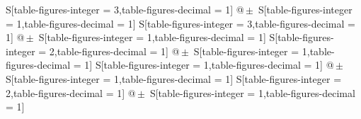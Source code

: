 \begin{table}[h]
\centering
\caption{Die Messwerte und die bereits berechneten Werte für die Wärmekapazitäten.}
\begin{tabular}{
	S[table-figures-integer = 3,table-figures-decimal = 1]
	@{\,$\pm{}$\,}
	S[table-figures-integer = 1,table-figures-decimal = 1]
	S[table-figures-integer = 3,table-figures-decimal = 1]
	@{\,$\pm{}$\,}
	S[table-figures-integer = 1,table-figures-decimal = 1]
	S[table-figures-integer = 2,table-figures-decimal = 1]
	@{\,$\pm{}$\,}
	S[table-figures-integer = 1,table-figures-decimal = 1]
	S[table-figures-integer = 1,table-figures-decimal = 1]
	@{\,$\pm{}$\,}
	S[table-figures-integer = 1,table-figures-decimal = 1]
	S[table-figures-integer = 2,table-figures-decimal = 1]
	@{\,$\pm{}$\,}
	S[table-figures-integer = 1,table-figures-decimal = 1]}


\end{tabular}
\end{table}
